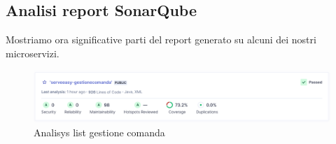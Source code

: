 \subsection{Analisi report SonarQube}
Mostriamo ora significative parti del report generato su alcuni dei nostri microservizi.

\begin{figure}[htbp]
	\centering
	\includegraphics[scale=0.50]{iterazione1/images/Analisys_list_gestione_comanda.png}
	\caption{Analisys list gestione comanda\label{fig:Analisys list gestione comanda}}
\end{figure}

